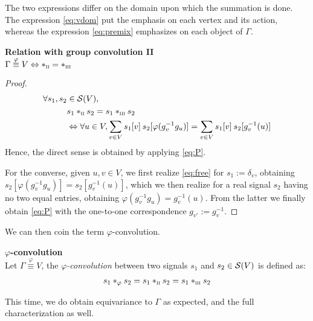 The two expressions differ on the domain upon which the summation is done. The expression \eqref{eq:vdom} put the emphasis on each vertex and its action, whereas the expression \eqref{eq:premix} emphasizes on each object of $\Gamma$.

\begin{lemma}\textbf{Relation with group convolution II}\\
$\Gamma \overset{\varphi}{\equiv} V \Leftrightarrow \ast_{\II} = \ast_{\III}$
\label{lem:rel23}
\end{lemma}

\begin{proof}
\begin{align}
\forall s_1, s_2 & \in \cs(V),\nonumber\\
& s_1 \ast_{\II} s_2 = s_1 \ast_{\III} s_2 \nonumber\\
& \Leftrightarrow \forall u \in V,
\displaystyle \sum_{v \in V} s_1[v] \h{2} s_2[\varphi(g_v^{-1}g_u)] = \displaystyle \sum_{v \in V} s_1[v] \h{2} s_2[g_v^{-1}(u)] \label{eq:free}
\end{align}
Hence, the direct sense is obtained by applying \eqref{eq:P}. 

For the converse, given $u, v \in V$, we first realize \eqref{eq:free} for $s_1 := \delta_v$, obtaining $s_2[\varphi(g_v^{-1}g_u)] = s_2[g_v^{-1}(u)]$, which we then realize for a real signal $s_2$ having no two equal entries, obtaining $\varphi(g_v^{-1}g_u) = g_v^{-1}(u)$. From the latter we finally obtain \eqref{eq:P} with the one-to-one correspondence $g_{v'} := g_v^{-1}$.
\end{proof}

We can then coin the term $\varphi$-convolution.

\begin{definition}\textbf{$\varphi$-convolution}\\
Let $\Gamma \overset{\varphi}{\equiv} V$, the \emph{$\varphi$-convolution} between two signals $s_1$ and $s_2 \in \cs(V)$ is defined as:
\begin{align*}
s_1 \ast_{\varphi} s_2 = s_1 \ast_{\II} s_2 = s_1 \ast_{\III} s_2
\end{align*}
\end{definition}

This time, we do obtain equivariance to $\Gamma$ as expected, and the full characterization as well.

